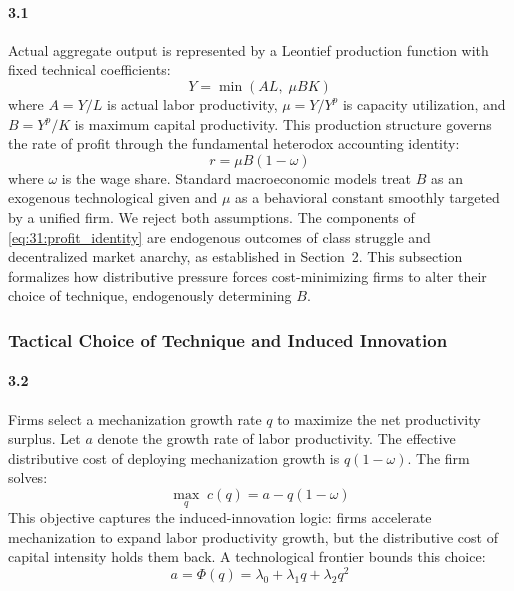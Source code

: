 \paragraph{3.1}
Actual aggregate output is represented by a Leontief
production function with fixed technical coefficients:
\begin{equation}
	Y = \min\left( A L,\; \mu B K \right)
	\label{eq:31:leontief}
\end{equation}
where $A = Y/L$ is actual labor productivity, $\mu = Y/Y^p$
is capacity utilization, and $B = Y^p/K$ is maximum capital
productivity. This production structure governs the rate of
profit through the fundamental heterodox accounting identity:
\begin{equation}
	r = \mu B (1 - \omega)
	\label{eq:31:profit_identity}
\end{equation}
where $\omega$ is the wage share. Standard macroeconomic
models treat $B$ as an exogenous technological given and $\mu$
as a behavioral constant smoothly targeted by a unified firm.
We reject both assumptions. The components of
\eqref{eq:31:profit_identity} are endogenous outcomes of
class struggle and decentralized market anarchy, as
established in Section~2. This subsection formalizes how
distributive pressure forces cost-minimizing firms to alter
their choice of technique, endogenously determining $B$.

\subsubsection{Tactical Choice of Technique and Induced
	Innovation}

\paragraph{3.2}
Firms select a mechanization growth rate $q$ to maximize the
net productivity surplus. Let $a$ denote the growth rate of
labor productivity. The effective distributive cost of
deploying mechanization growth is $q(1-\omega)$. The firm
solves:
\begin{equation}
	\max_{q}\; c(q) = a - q(1-\omega)
	\label{eq:31:objective}
\end{equation}
This objective captures the induced-innovation logic: firms
accelerate mechanization to expand labor productivity growth,
but the distributive cost of capital intensity holds them
back. A technological frontier bounds this choice:
\begin{equation}
	a = \Phi(q) = \lambda_0 + \lambda_1 q + \lambda_2 q^2
	\label{eq:31:frontier}
\end{equation}

